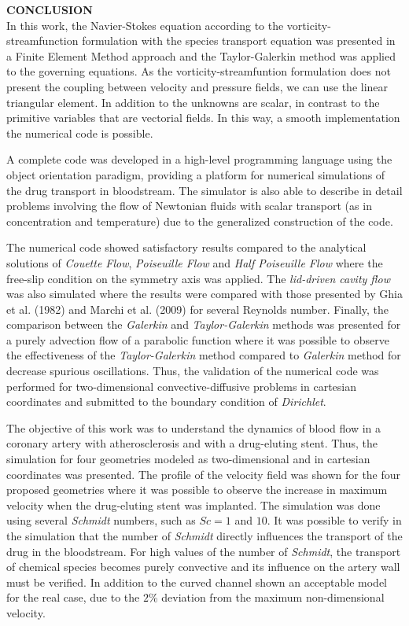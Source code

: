 \clearpage
\noindent\textbf{CONCLUSION}
$\!$\\

In this work, the Navier-Stokes equation according to the 
vorticity-streamfunction formulation with the species transport 
equation was presented in a Finite Element Method approach 
and the Taylor-Galerkin method was applied to the governing equations. 
As the vorticity-streamfuntion formulation does not present the 
coupling between velocity and pressure fields, we can use the 
linear triangular element. In addition to the unknowns are scalar,
in contrast to the primitive variables that are vectorial fields.
In this way, a smooth implementation 
the numerical code is possible.

\medskip
A complete code was developed in a high-level programming language 
using the object orientation paradigm, providing a platform for numerical
simulations of the drug transport in bloodstream. The simulator 
is also able to describe in detail problems involving the flow 
of Newtonian fluids with scalar transport 
(as in concentration and temperature) due to the generalized 
construction of the code.

\medskip
The numerical code showed satisfactory results compared to the 
analytical solutions of \textit{Couette Flow}, 
\textit{Poiseuille Flow} and \textit{Half Poiseuille Flow} 
where the free-slip condition on the symmetry axis was applied. 
The \textit{lid-driven cavity flow} was also simulated where the 
results were compared with those presented by Ghia et al. (1982) 
\cite{ghia1982} and Marchi et al. (2009) \cite{marchi2009} 
for several Reynolds number. Finally, the comparison between the 
\textit{Galerkin} and \textit{Taylor-Galerkin} methods was 
presented for a purely advection flow of a parabolic function 
where it was possible to observe the effectiveness of the 
\textit{Taylor-Galerkin} method compared to \textit{Galerkin} method 
for decrease spurious oscillations. Thus, the validation of the 
numerical code was performed for two-dimensional 
convective-diffusive problems in cartesian coordinates 
and submitted to the boundary condition of \textit{Dirichlet}.

\medskip
The objective of this work was to understand the dynamics of blood 
flow in a coronary artery with atherosclerosis and with 
a drug-eluting stent. Thus, the simulation for four geometries 
modeled as two-dimensional and in cartesian coordinates was presented. 
The profile of the velocity field was shown for the four proposed 
geometries where it was possible to observe the increase 
in maximum velocity when the drug-eluting stent was implanted. 
The simulation was done using several \textit{Schmidt} numbers, 
such as $Sc=1$ and $10$. It was possible to verify in the 
simulation that the number of \textit{Schmidt} directly influences 
the transport of the drug in the bloodstream. For high values of 
the number of \textit{Schmidt}, the transport of chemical species 
becomes purely convective and its influence on the artery 
wall must be verified. In addition to the curved channel shown an
acceptable model for the real case, due to the $2$\% deviation
from the maximum non-dimensional velocity.

